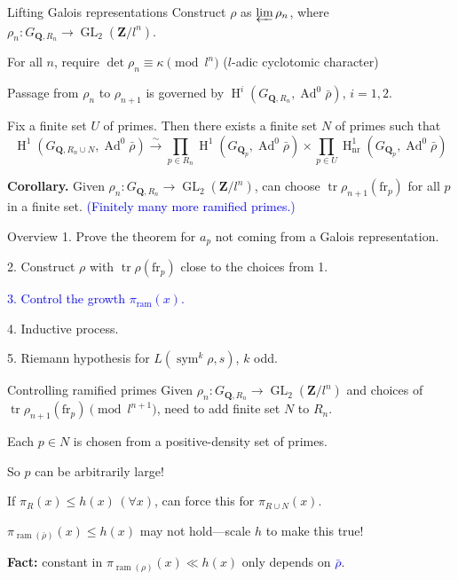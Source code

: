 \documentclass{beamer}
\DeclareMathOperator{\Ad}{Ad}
\DeclareMathOperator{\GL}{GL}
\DeclareMathOperator{\h}{H}
\DeclareMathOperator{\ram}{ram}
\DeclareMathOperator{\sym}{sym}
\DeclareMathOperator{\tr}{tr}
\newcommand{\bQ}{\mathbf{Q}}
\newcommand{\bZ}{\mathbf{Z}}
\newcommand{\frob}{\mathrm{fr}}
\begin{document}
\begin{frame}{Lifting Galois representations}
Construct $\rho$ as $\varprojlim \rho_n$, where 
$\rho_n\colon G_{\bQ,R_n} \to \GL_2(\bZ/l^n)$.
\pause

For all $n$, require $\det\rho_n \equiv \kappa\pmod{l^n}$
\pause
($l$-adic cyclotomic character)
\pause

Passage from $\rho_n$ to $\rho_{n+1}$ is governed by 
$\h^i(G_{\bQ,R_n},\Ad^0\bar\rho)$, $i = 1,2$.
\pause

\begin{theorem}
Fix a finite set $U$ of primes. Then there exists a finite set $N$ of primes 
such that 
\[
	\h^1(G_{\bQ,R_n\cup N},\Ad^0\bar\rho) \xrightarrow{\sim}\prod_{p\in R_n} \h^1(G_{\bQ_p}, \Ad^0\bar\rho) \times \prod_{p\in U} \h_\mathrm{nr}^1(G_{\bQ_p},\Ad^0\bar\rho)
\]
\end{theorem}

\textbf{Corollary.}
Given $\rho_n\colon G_{\bQ,R_n} \to \GL_2(\bZ/l^n)$, can choose 
$\tr\rho_{n+1}(\frob_p)$ for all $p$ in a finite set.
\pause
\textcolor{blue}{(Finitely many more ramified primes.)}
\end{frame}



\begin{frame}{Overview}
\color{shade}
1. Prove the theorem for $a_p$ not coming from a Galois representation.

2. Construct $\rho$ with $\tr\rho(\frob_p)$ close to the choices from 1.

\textcolor{blue}{
3. Control the growth $\pi_{\ram}(x)$.}

4. Inductive process.

5. Riemann hypothesis for $L(\sym^k\rho,s)$, $k$ odd.
\end{frame}



\begin{frame}{Controlling ramified primes}
Given $\rho_n\colon G_{\bQ,R_n} \to \GL_2(\bZ/l^n)$ and choices of 
$\tr \rho_{n+1}(\frob_p)\pmod{l^{n+1}}$, need to add finite set $N$ to 
$R_n$. 
\pause

Each $p\in N$ is chosen from a positive-density set of primes.
\pause

So $p$ can be arbitrarily large!
\pause

If $\pi_R(x) \leqslant h(x)\,(\forall x)$, can force this for 
$\pi_{R\cup N}(x)$. 
\pause

$\pi_{\ram(\bar\rho)}(x)\leqslant h(x)$ may not hold---scale $h$ to make this 
true!
\pause

\textbf{Fact:} constant in $\pi_{\ram(\rho)}(x) \ll h(x)$ only depends on 
\textcolor{blue}{$\bar\rho$}. 
\end{frame}
\end{document}
